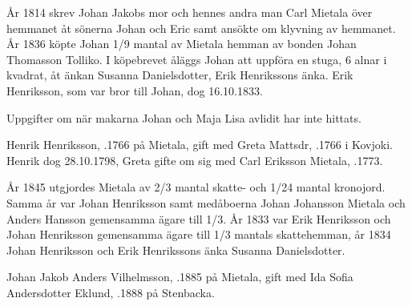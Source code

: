 År 1814 skrev Johan Jakobs mor och hennes andra man Carl Mietala över hemmanet åt sönerna Johan och Eric samt ansökte om klyvning av hemmanet. År 1836 köpte Johan 1/9 mantal av Mietala hemman av bonden Johan Thomasson Tolliko. I köpebrevet åläggs Johan att uppföra en stuga, 6 alnar i kvadrat, åt änkan Susanna Danielsdotter, Erik Henrikssons änka. Erik Henriksson, som var bror till Johan, dog 16.10.1833.

Uppgifter om när makarna Johan och Maja Lisa avlidit har inte hittats.


Henrik Henriksson, .1766 på Mietala, gift med Greta Mattsdr, .1766 i Kovjoki. Henrik dog 28.10.1798, Greta gifte om sig med Carl Eriksson Mietala, .1773.
\begin{jhchildren}
  \item {}
  \item {}
  \item {}
  \item {}
  \item {}
  \item {}
  \item {}
\end{jhchildren}

År 1845 utgjordes Mietala av 2/3 mantal skatte- och 1/24 mantal kronojord. Samma år var Johan Henriksson samt medåboerna Johan Johansson Mietala och Anders Hansson gemensamma ägare till 1/3. År 1833 var Erik Henriksson och Johan Henriksson gemensamma ägare till 1/3 mantals skattehemman, år 1834 Johan Henriksson och Erik Henrikssons änka Susanna Danielsdotter.





Johan Jakob Anders Vilhelmsson, .1885 på Mietala, gift med Ida Sofia Andersdotter Eklund, .1888 på Stenbacka.
\begin{jhchildren}
  \item {}
  \item {}
  \item {}
\end{jhchildren}

